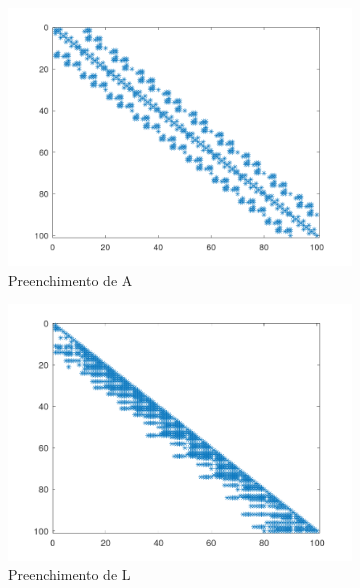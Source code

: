 \documentclass{article}
\begin{document}
\begin{figure}[H]
    \centering
    \begin{subfigure}[b]{0.3\textwidth}
         \centering
         \includegraphics[width=\textwidth]{image/nos4spyA.png}
         \caption{Preenchimento de A}
         \label{fig:nos4-spyA}
    \end{subfigure}
    \hfill
    \begin{subfigure}[b]{0.3\textwidth}
         \centering
         \includegraphics[width=\textwidth]{image/nos4spyL.png}
         \caption{Preenchimento de L}
         \label{fig:nos4-spyL}
    \end{subfigure}
    \hfill
    \begin{subfigure}[b]{0.3\textwidth}

\end{subfigure}
\end{figure}
\end{document}
